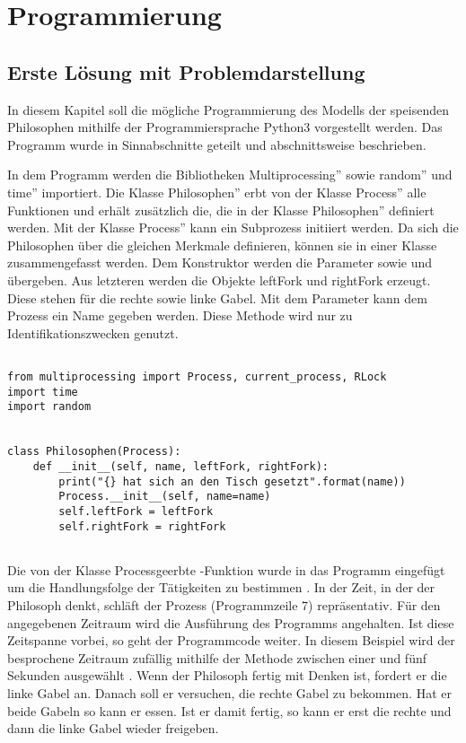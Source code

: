 \chapter{Programmierung}
\label{programmierung}
\section{Erste Lösung mit Problemdarstellung}
\label{erste_lösung}

In diesem Kapitel soll die mögliche Programmierung des Modells der speisenden Philosophen mithilfe der Programmiersprache Python3 vorgestellt werden. Das Programm wurde in Sinnabschnitte geteilt und abschnittsweise beschrieben.

In dem Programm werden die Bibliotheken \glqq Multiprocessing'' sowie \glqq random'' und \glqq time'' importiert. Die Klasse \glqq Philosophen'' erbt von der Klasse \glqq Process'' alle Funktionen und erhält zusätzlich die, die in der Klasse \glqq Philosophen'' definiert werden. Mit der Klasse \glqq Process'' kann ein Subprozess initiiert werden. Da sich die Philosophen über die gleichen Merkmale definieren, können sie in einer Klasse zusammengefasst werden. Dem Konstruktor werden die Parameter  sowie  und   übergeben. Aus letzteren werden die Objekte leftFork und rightFork erzeugt. Diese stehen für die rechte sowie linke Gabel. Mit dem Parameter  kann dem Prozess ein Name gegeben werden. \glqq Diese Methode wird nur zu Identifikationszwecken genutzt\grqq \parencite{lock}.

\begin{lstlisting}[style = Python, label = {Code_erste_lösung}, caption = {Klasse Philosophen}]

from multiprocessing import Process, current_process, RLock
import time
import random


class Philosophen(Process):
    def __init__(self, name, leftFork, rightFork):
        print("{} hat sich an den Tisch gesetzt".format(name))
        Process.__init__(self, name=name)
        self.leftFork = leftFork
        self.rightFork = rightFork
        
\end{lstlisting}

Die von der Klasse \glqq Process\grqq geerbte  -Funktion wurde in das Programm eingefügt um die Handlungsfolge der Tätigkeiten zu bestimmen \parencite[vgl.]{lock} . In der Zeit, in der der Philosoph denkt, schläft der Prozess (Programmzeile 7) repräsentativ. Für den angegebenen Zeitraum wird die Ausführung des Programms angehalten. Ist diese Zeitspanne vorbei, so geht der Programmcode weiter. In diesem Beispiel wird der besprochene Zeitraum zufällig mithilfe der  Methode zwischen einer und fünf Sekunden ausgewählt \parencite[vgl.]{sleep}. Wenn der Philosoph fertig mit Denken ist, fordert er die linke Gabel an. Danach soll er versuchen, die rechte Gabel zu bekommen. Hat er beide Gabeln so kann er essen. Ist er damit fertig, so kann er erst die rechte und dann die linke Gabel wieder freigeben.


